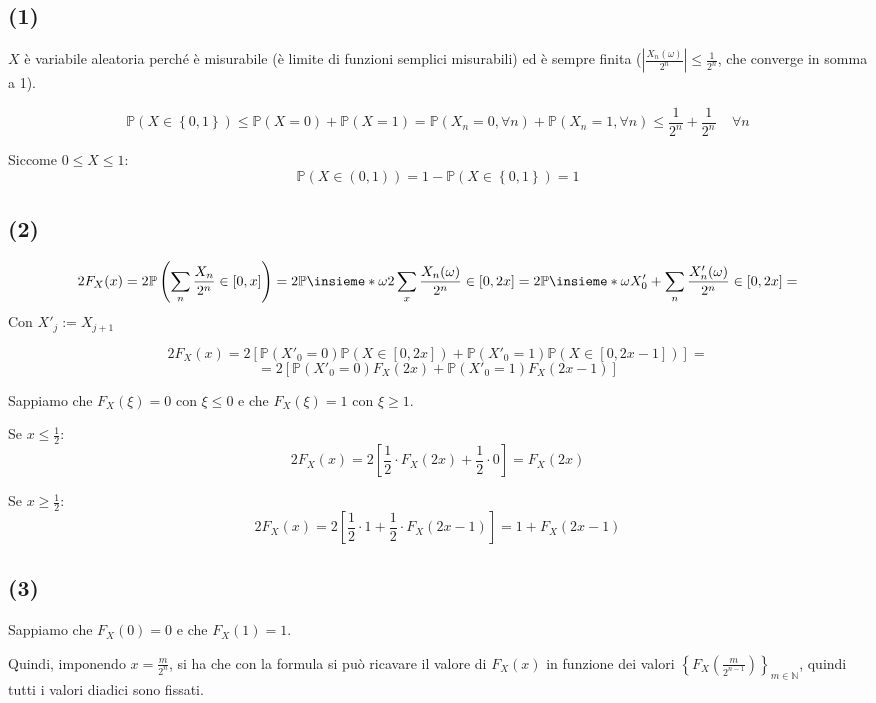 \documentclass{article}
\begin{document}
\subsection{(1)}
$X$ è variabile aleatoria perché è misurabile (è limite di funzioni semplici misurabili) ed è sempre finita ($\left|  \frac{X_n(\omega )}{2^n} \right|  \leq  \frac{1}{2^n}$, che converge in somma a 1).

\[
	\mathbb{P}\left(X\in \left\{0,1\right\}\right) \leq  \mathbb{P}\left(X=0\right) + \mathbb{P}\left(X=1\right) = \mathbb{P}\left(X_n = 0, \forall  n\right) + \mathbb{P}\left(X_n = 1, \forall  n\right)  \leq  \frac{1}{2^n} + \frac{1}{2^n} \ \ \ \ \  \forall  n
\]

Siccome $0 \leq  X \leq  1$:
\[
	\mathbb{P}\left(X \in (0,1)\right) = 1-\mathbb{P}\left(X \in \left\{0,1\right\}\right) = 1
\]

\subsection{(2)}
\[
2F_X(x) = 2\mathbb{P}\left(\sum_{n} \frac{X_n}{2^n} \in  [0,x]\right) = 2 \mathbb{P}\insieme*{\omega }{ 2\sum_{x}\frac{X_n (\omega )}{2^n} \in  [0,2x]} = 2\mathbb{P}\insieme*{\omega}{ X_0' + \sum_{n}\frac{X'_n(\omega )}{2^n} \in  [0,2x]} = 
\]
Con $X'_j := X_{j+1}$

\[
	2F_X(x)=2\left[\mathbb{P}\left(X'_0=0\right) \mathbb{P}\left(X\in [0,2x]\right)  +  \mathbb{P}\left(X'_0=1\right)\mathbb{P}\left(X\in [0,2x-1]\right)\right] =
\]
\[
	=2\left[\mathbb{P}\left(X'_0=0\right) F_X(2x) +  \mathbb{P}\left(X'_0=1\right)F_X(2x-1)\right]
\]

Sappiamo che $F_X(\xi)=0$ con $\xi\leq 0$ e che $F_X(\xi)=1$ con $\xi\geq 1$.

Se $x \leq  \frac{1}{2}$:
\[
	2F_X(x) = 2\left[\frac{1}{2} \cdot  F_X(2x) + \frac{1}{2} \cdot  0\right] = F_X(2x)
\]

Se $x \geq  \frac{1}{2}$:
\[
	2F_X(x) = 2\left[\frac{1}{2} \cdot  1 + \frac{1}{2} \cdot  F_X(2x-1)\right] = 1+F_X(2x-1)
\]


\subsection{(3)}
Sappiamo che $F_X\left(0\right)=0$ e che $F_X(1)=1$.

Quindi, imponendo $x=\frac{m}{2^n}$, si ha che con la formula si può ricavare il valore di $F_X(x)$ in funzione dei valori $\left\{F_X(\frac{m}{2^{n-1}})\right\}_{m\in \mathbb{N}}$, quindi tutti i valori diadici sono fissati.
\end{document}
